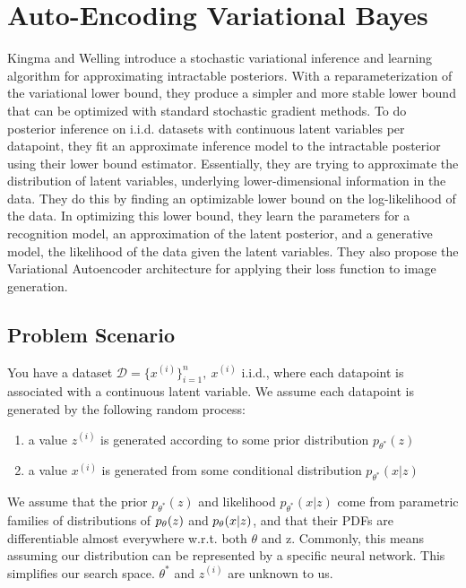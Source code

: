 \documentclass{article}
\begin{document}
\section{Auto-Encoding Variational Bayes}
Kingma and Welling introduce a stochastic variational inference and learning algorithm for approximating intractable posteriors. With a reparameterization of the variational lower bound, they produce a simpler and more stable lower bound that can be optimized with standard stochastic gradient methods. To do posterior inference on i.i.d. datasets with continuous latent variables per datapoint, they fit an approximate inference model to the intractable posterior using their lower bound estimator. Essentially, they are trying to approximate the distribution of latent variables, underlying lower-dimensional information in the data. They do this by finding an optimizable lower bound on the log-likelihood of the data. In optimizing this lower bound, they learn the parameters for a recognition model, an approximation of the latent posterior, and a generative model, the likelihood of the data given the latent variables. They also propose the Variational Autoencoder architecture for applying their loss function to image generation. \\

\subsection{Problem Scenario}
You have a dataset $\mathcal{D} = \{x^{(i)}\}_{i=1}^n,~ x^{(i)}$ i.i.d., where each datapoint is associated with a continuous latent variable. We assume each datapoint is generated by the following random process:
\begin{enumerate}
    \item a value $z^{(i)}$ is generated according to some prior distribution $p_{\theta^*}(z)$
    \item a value $x^{(i)}$ is generated from some conditional distribution $p_{\theta^*}(x|z)$
\end{enumerate}
We assume that the prior $p_{\theta^*}(z)$ and likelihood $p_{\theta^*}(x|z)$ come from parametric families of distributions of $p_\theta(z)$ and $p_\theta(x|z)$, and that their PDFs are differentiable almost everywhere w.r.t. both $\theta$ and z. Commonly, this means assuming our distribution can be represented by a specific neural network. This simplifies our search space. $\theta^*$ and $z^{(i)}$ are unknown to us. \\
\end{document}
